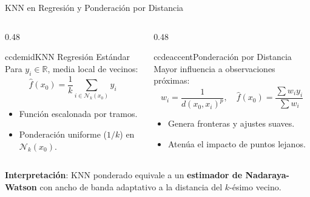 \begin{frame}{KNN en Regresión y Ponderación por Distancia}
\begin{columns}[T,onlytextwidth]
\begin{column}{0.48\textwidth}
\begin{contrastbox}{ccdemid}{KNN Regresión Estándar}
\footnotesize
Para $y_i \in \mathbb{R}$, media local de vecinos:
\[
\hat{f}(x_0) = \frac{1}{k} \sum_{i \in \mathcal{N}_k(x_0)} y_i
\]
\begin{itemize}\setlength{\itemsep}{0.06em}
  \item Función escalonada por tramos.
  \item Ponderación uniforme ($1/k$) en $\mathcal{N}_k(x_0)$.
\end{itemize}
\end{contrastbox}
\end{column}

\begin{column}{0.48\textwidth}
\begin{contrastbox}{ccdeaccent}{Ponderación por Distancia}
\footnotesize
Mayor influencia a observaciones próximas:
\[
w_i = \frac{1}{d(x_0, x_i)^p}, \quad \hat{f}(x_0) = \frac{\sum w_i y_i}{\sum w_i}
\]
\begin{itemize}\setlength{\itemsep}{0.06em}
  \item Genera fronteras y ajustes suaves.
  \item Atenúa el impacto de puntos lejanos.
\end{itemize}
\end{contrastbox}
\end{column}
\end{columns}

\vspace{0.06cm}
\begin{ccdebox}
\scriptsize \textbf{Interpretación}: KNN ponderado equivale a un \textbf{estimador de Nadaraya-Watson} con ancho de banda adaptativo a la distancia del $k$-ésimo vecino.
\end{ccdebox}
\end{frame}
